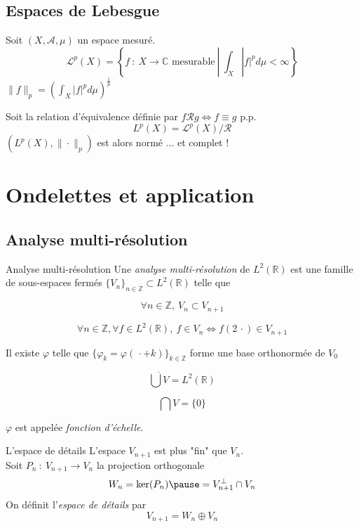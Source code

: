\documentclass[french]{beamer}
\begin{document}
\subsection{Espaces de Lebesgue}

\begin{frame}
	Soit $(X, \mathcal{A}, \mu)$ un espace mesuré.\\
	\pause
	$$\mathcal{L}^p(X) = \left\{f ~: ~ X \to \mathbb{C} \text{ mesurable} ~ | ~ \int_X |f|^p d\mu < \infty \right\}$$
	\pause
	$\|f\|_p = \left(\displaystyle \int_X |f|^p d\mu \right)^{\frac{1}{p}}$
\end{frame}

\begin{frame}
		Soit la relation d'équivalence définie par $f \mathcal{R} g \Longleftrightarrow f \equiv g$ p.p.
		\pause
		$$L^p(X) = \mathcal{L}^p(X)/\mathcal{R}$$
		\pause
		$(L^p(X), \|\cdot\|_p)$ est alors normé ... \pause et complet !
\end{frame}

\section{Ondelettes et application}

\subsection{Analyse multi-résolution}

\begin{frame}{Analyse multi-résolution}
	Une \textit{analyse multi-résolution} de $L^2(\mathbb{R})$ est une famille de sous-espaces fermés $\{V_n\}_{n \in \mathbb{Z}} \subset L^2(\mathbb{R})$ telle que
	
	\pause
	$$\forall n \in \mathbb{Z}, ~ V_{n} \subset V_{n+1}$$

	\pause
	$$\forall n \in \mathbb{Z}, \forall f \in L^2(\mathbb{R}), ~ f \in V_n \Longleftrightarrow f (2 \, \cdot ) \in V_{n+1}$$
	
	\pause
	Il existe $\varphi$ telle que $\{\varphi_k = \varphi(\, \cdot + k)\}_{k \in \mathbb{Z}}$ forme une base orthonormée de $V_0$

	\pause
	$$\overline{\bigcup V} = L^2(\mathbb{R})$$
	
	\pause
	$$\bigcap V = \{0\}$$

	\pause			
	$\varphi$ est appelée \textit{fonction d'échelle}.
\end{frame}


\begin{frame}{L'espace de détails}
	L'espace $V_{n+1}$ est plus "fin" que $V_n$.\\
	\pause
	Soit $P_n ~ : ~ V_{n+1} \rightarrow V_n$ la projection orthogonale \pause $$W_n = \ker (P_n) \pause = V_{n+1}^\bot \cap V_n$$
	\pause
	On définit l'\textit{espace de détails} par
	$$V_{n+1} = W_n \oplus V_n$$\\
\end{frame}
\end{document}
